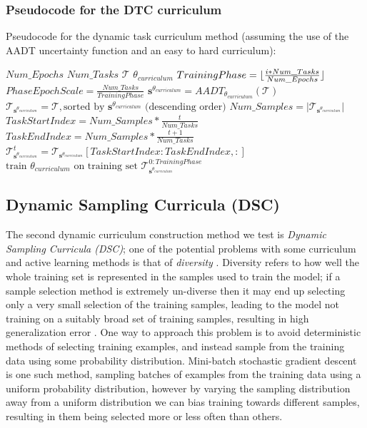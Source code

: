 \subsubsection{Pseudocode for the DTC curriculum}\label{sec:DTCPseudocode}
Pseudocode for the dynamic task curriculum method (assuming the use of the AADT uncertainty function and an easy to hard curriculum):
\begin{algorithmic}
\REQUIRE $Num\_Epochs$
\REQUIRE $Num\_Tasks$
\REQUIRE $\mathcal{T}$ 
\REQUIRE $\theta_{curriculum}$ 
\STATE $TrainingPhase = \lfloor\frac{i*Num\_Tasks}{Num\_Epochs}\rfloor$
\STATE $PhaseEpochScale = \frac{Num\_Tasks}{TrainingPhase}$
\STATE $\mathbf{s}^{\theta_{curriculum}} = AADT_{\theta_{curriculum}}(\mathcal{T})$
\STATE $\mathcal{T}_{\mathbf{s}^{\theta_{curriculum}}} = \mathcal{T}, \text{sorted by } \mathbf{s}^{\theta_{curriculum}} \text{ (descending order)}$ 
\STATE $Num\_Samples = |\mathcal{T}_{\mathbf{s}^{\theta_{curriculum}}}|$
\STATE $TaskStartIndex = Num\_Samples*\frac{t}{Num\_Tasks} $
\STATE $TaskEndIndex = Num\_Samples*\frac{t+1}{Num\_Tasks} $
\STATE $\mathcal{T}^{t}_{\mathbf{s}^{\theta_{curriculum}}} = \mathcal{T}_{\mathbf{s}^{\theta_{curriculum}}}[TaskStartIndex:TaskEndIndex,:] $
\ENDFOR
\STATE $\text{train }  \theta_{curriculum} \text{ on training set } \mathcal{T}^{0:TrainingPhase}_{\mathbf{s}^{\theta_{curriculum}}} $
\ENDFOR
\ENDFOR
\end{algorithmic}


\subsection{Dynamic Sampling Curricula (DSC)}
The second dynamic curriculum construction method we test is \textit{Dynamic Sampling Curricula (DSC)}; one of the potential problems with some curriculum and active learning methods is that of \textit{diversity} \cite{jiang2014self}. Diversity refers to how well the whole training set is represented in the samples used to train the model; if a sample selection method is extremely un-diverse then it may end up selecting only a very small selection of the training samples, leading to the model not training on a suitably broad set of training samples, resulting in high generalization error \cite{jiang2014self}. One way to approach this problem is to avoid deterministic methods of selecting training examples, and instead sample from the training data using some probability distribution. Mini-batch stochastic gradient descent is one such method, sampling batches of examples from the training data using a uniform probability distribution, however by varying the sampling distribution away from a uniform distribution we can bias training towards different samples, resulting in them being selected more or less often than others. 


